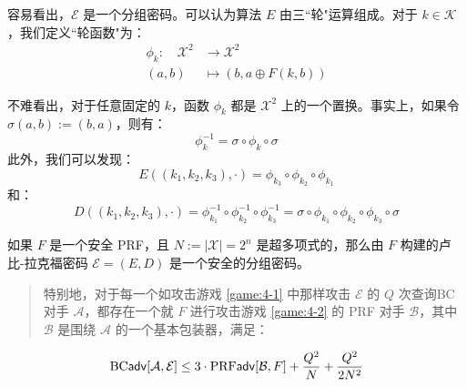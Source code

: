 容易看出，$\mathcal{E}$ 是一个分组密码。可以认为算法 $E$ 由三``轮"运算组成。对于 $k\in\mathcal{K}$，我们定义``轮函数"为：
\[
\begin{aligned}
\phi_k:\quad\mathcal{X}^2 & \to \mathcal{X}^2\\
(a,b) & \mapsto (b,a\oplus F(k,b))
\end{aligned}
\]

不难看出，对于任意固定的 $k$，函数 $\phi_k$ 都是 $\mathcal{X}^2$ 上的一个置换。事实上，如果令 $\sigma(a,b):=(b,a)$，则有：
\[
\phi_k^{-1}=\sigma\circ\phi_k\circ\sigma
\]
此外，我们可以发现：
\[
E((k_1,k_2,k_3),\cdot)=\phi_{k_3}\circ\phi_{k_2}\circ\phi_{k_1} 
\]
和：
\[
D((k_1,k_2,k_3),\cdot)=\phi^{-1}_{k_1}\circ\phi^{-1}_{k_2}\circ\phi^{-1}_{k_3}=\sigma\circ\phi_{k_1}\circ\phi_{k_2}\circ\phi_{k_3}\circ\sigma
\]

\begin{theorem}
如果 $F$ 是一个安全 PRF，且 $N:=|\mathcal{X}|=2^n$ 是超多项式的，那么由 $F$ 构建的卢比-拉克福密码 $\mathcal{E}=(E,D)$ 是一个安全的分组密码。
\begin{quote}
特别地，对于每一个如攻击游戏 \ref{game:4-1} 中那样攻击 $\mathcal{E}$ 的 $Q$ 次查询BC对手 $\mathcal{A}$，都存在一个就 $F$ 进行攻击游戏 \ref{game:4-2} 的 PRF 对手 $\mathcal{B}$，其中 $\mathcal{B}$ 是围绕 $\mathcal{A}$ 的一个基本包装器，满足：
\end{quote}
\[
{\rm BC\mathsf{adv}}[\mathcal{A},\mathcal{E}]\leq3\cdot{\rm PRF\mathsf{adv}}[\mathcal{B},F]+\frac{Q^2}{N}+\frac{Q^2}{2N^2}
\]
\end{theorem}

